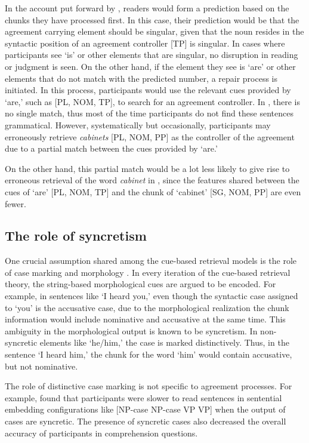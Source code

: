 \documentclass[10pt,letterpaper]{article}
\begin{document}
In the account put forward by , readers would form a prediction based on the chunks they have processed first. In this case, their prediction would be that the agreement carrying element should be singular, given that the noun resides in the syntactic position of an agreement controller [TP] is singular. In cases where participants see `is' or other elements that are singular, no disruption in reading or judgment is seen. On the other hand, if the element they see is `are' or other elements that do not match with the predicted number, a repair process is initiated. In this process, participants would use the relevant cues provided by `are,' such as [PL, NOM, TP], to search for an agreement controller. In , there is no single match, thus most of the time participants do not find these sentences grammatical. However, systematically but occasionally, participants may erroneously retrieve \textit{cabinets} [PL, NOM, PP] as the controller of the agreement due to a partial match between the cues provided by `are.'

On the other hand, this partial match would be a lot less likely to give rise to erroneous retrieval of the word \textit{cabinet} in , since the features shared between the cues of `are' [PL, NOM, TP] and the chunk of `cabinet' [SG, NOM, PP] are even fewer.


\subsection{The role of syncretism}

One crucial assumption shared among the cue-based retrieval models is the role of case marking and morphology \cite{LewisVasishth2005}. In every iteration of the cue-based retrieval theory, the string-based morphological cues are argued to be encoded. For example, in sentences like `I heard you,' even though the syntactic case assigned to `you' is the accusative case, due to the morphological realization the chunk information would include nominative and accusative at the same time. This ambiguity in the morphological output is known to be syncretism. In non-syncretic elements like `he/him,' the case is marked distinctively. Thus, in the sentence `I heard him,' the chunk for the word `him' would contain accusative, but not nominative. 

The role of distinctive case marking is not specific to agreement processes. For example,  found that participants were slower to read sentences in sentential embedding configurations like [NP-case NP-case VP VP] when the output of cases are syncretic. The presence of syncretic cases also decreased the overall accuracy of participants in comprehension questions.
\end{document}
